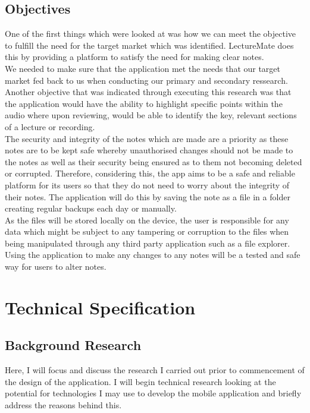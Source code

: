 \documentclass{report}
\begin{document}
	\section{Objectives}
One of the first things which were looked at was how we can meet the objective to fulfill the need for the target market which was identified. LectureMate does this by providing a platform to satisfy the need for making clear notes.\\

We needed to make sure that the application met the needs that our target market fed back to us when conducting our primary and secondary ressearch. Another objective that was indicated through executing this research was that the application would have the ability to highlight specific points within the audio where upon reviewing, would be able to identify the key, relevant sections of a lecture or recording.\\

The security and integrity of the notes which are made are a priority as these notes are to be kept safe whereby unauthorised changes should not be made to the notes as well as their security being ensured as to them not becoming deleted or corrupted. Therefore, considering this, the app aims to be a safe and reliable platform for its users so that they do not need to worry about the integrity of their notes. The application will do this by saving the note as a file in a folder creating regular backups each day or manually.\\

As the files will be stored locally on the device, the user is responsible for any data which might be subject to any tampering or corruption to the files when being manipulated through any third party application such as a file explorer. Using the application to make any changes to any notes will be a tested and safe way for users to alter notes.

\chapter{Technical Specification}
	\section{Background Research}
	Here, I will focus and discuss the research I carried out prior to commencement of the design of the application. I will begin technical research looking at the potential for technologies I may use to develop the mobile application and briefly address the reasons behind this.
\end{document}
